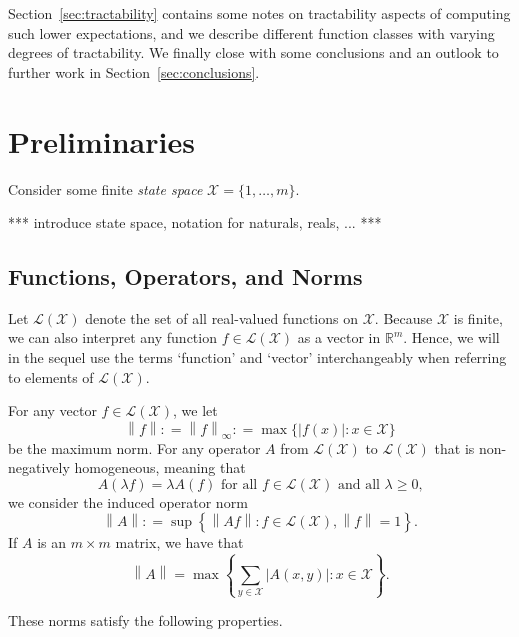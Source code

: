 \documentclass[10pt]{paper}
\theoremstyle{definition}
\newcommand{\reals}{\mathbb{R}}
\newcommand{\states}{\mathcal{X}}
\newcommand{\gambles}{\mathcal{L}}
\newcommand{\gamblesX}{\gambles(\states)}
\newcommand{\norm}[1]{\left\lVert #1 \right\rVert}
\newcommand{\abs}[1]{\left\vert #1 \right\vert}
\newcommand{\coloneqq}{:\!=}
\begin{document}
Section~\ref{sec:tractability} contains some notes on tractability aspects of  computing such lower expectations, and we describe different function classes with varying degrees of tractability. We finally close with some conclusions and an outlook to further work in Section~\ref{sec:conclusions}.

\section{Preliminaries}\label{sec:prelim}

Consider some finite \emph{state space} $\states=\{1,\dots,m\}$.

*** introduce state space, notation for naturals, reals, ... ***

\subsection{Functions, Operators, and Norms}\label{sec:func_oper_norm}
Let $\gamblesX$ denote the set of all real-valued functions on $\states$. Because $\states$ is finite, we can also interpret any function $f\in\gamblesX$ as a vector in $\reals^m$. Hence, we will in the sequel use the terms `function' and `vector' interchangeably when referring to elements of $\gamblesX$.

For any vector $f\in\gamblesX$, we let
\begin{equation*}
\norm{f}\coloneqq\norm{f}_{\infty}\coloneqq\max\{\abs {f(x)}\colon x\in\states\}
\end{equation*}
be the maximum norm. For any operator $A$ from $\gamblesX$ to $\gamblesX$ that is non-negatively homogeneous, meaning that
\begin{equation*}
A(\lambda f)=\lambda A(f)\text{ for all $f\in\gamblesX$ and all $\lambda\geq0$,}
\end{equation*}
we consider the induced operator norm
\begin{equation*}
\norm{A}\coloneqq\sup\left\{\norm{Af}\colon f\in\gamblesX,\norm{f}=1\right\}.
\end{equation*}
If $A$ is an $m\times m$ matrix, we have that
\begin{equation*}
\norm{A}
=
\max\left\{\sum_{y\in\states}\abs{A(x,y)}\colon x\in\states\right\}.
\end{equation*}

\noindent
These norms satisfy the following properties. 
\end{document}

